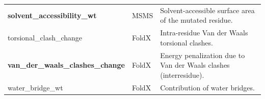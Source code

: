 \begin{table}[!htb]
\begin{tabular}{ l | l | p{7cm} }
		\textbf{solvent\_accessibility\_wt}       & MSMS           & Solvent-accessible surface area of the mutated residue.                                             \\
		torsional\_clash\_change                  & FoldX          & Intra-residue Van der Waals torsional clashes.                                                      \\
		\textbf{van\_der\_waals\_clashes\_change} & FoldX          & Energy penalization due to Van der Waals clashes (interresidue).                                    \\
		water\_bridge\_wt                         & FoldX          & Contribution of water bridges.                                                                      \\
		\bottomrule
	\end{tabular}
\end{table}


